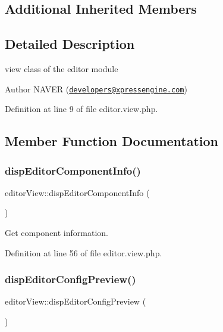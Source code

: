 \subsection*{Additional Inherited Members}


\subsection{Detailed Description}
view class of the editor module 

\begin{DoxyAuthor}{Author}
N\+A\+V\+ER (\href{mailto:developers@xpressengine.com}{\tt developers@xpressengine.\+com}) 
\end{DoxyAuthor}


Definition at line 9 of file editor.\+view.\+php.



\subsection{Member Function Documentation}
\hypertarget{classeditorView_ab303eb3a43e6099484f3c7a090ef3a91}{}\label{classeditorView_ab303eb3a43e6099484f3c7a090ef3a91} 
\subsubsection{\texorpdfstring{disp\+Editor\+Component\+Info()}{dispEditorComponentInfo()}}
{\footnotesize\ttfamily editor\+View\+::disp\+Editor\+Component\+Info (\begin{DoxyParamCaption}{ }\end{DoxyParamCaption})}



Get component information. 



Definition at line 56 of file editor.\+view.\+php.

\hypertarget{classeditorView_aeaef8bfc0e3897c7dadbc8cffc1e4bd5}{}\label{classeditorView_aeaef8bfc0e3897c7dadbc8cffc1e4bd5} 
\subsubsection{\texorpdfstring{disp\+Editor\+Config\+Preview()}{dispEditorConfigPreview()}}
{\footnotesize\ttfamily editor\+View\+::disp\+Editor\+Config\+Preview (\begin{DoxyParamCaption}{ }\end{DoxyParamCaption})}




